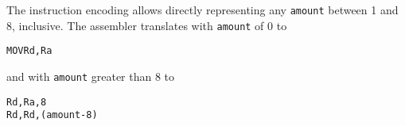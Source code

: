 \begin{remarks}
The instruction encoding allows directly representing any \texttt{amount} between 1 and 8, inclusive. The assembler translates \texttt{\mnemonic} with \texttt{amount} of 0 to
\begin{alltt}
  MOV  Rd, Ra
\end{alltt}
and \texttt{\mnemonic} with \texttt{amount} greater than 8 to
\begin{alltt}
  \mnemonic Rd, Ra, 8
  \mnemonic Rd, Rd, (amount - 8)
\end{alltt}
\end{remarks}
